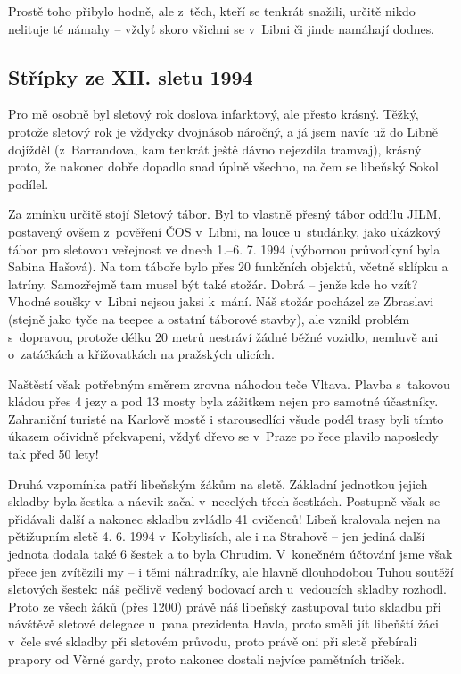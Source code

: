 \documentclass[a5paper, 11pt, twoside]{article}
\begin{document}
Prostě toho přibylo hodně, ale z~těch, kteří se tenkrát snažili, určitě
nikdo nelituje té námahy -- vždyť skoro všichni se v~Libni či jinde
namáhají dodnes.

\subsection{Střípky ze XII. sletu
1994}

Pro mě osobně byl sletový rok doslova infarktový, ale přesto krásný.
Těžký, protože sletový rok je vždycky dvojnásob náročný, a já jsem navíc
už do Libně dojížděl (z~Barrandova, kam tenkrát ještě dávno nejezdila
tramvaj), krásný proto, že nakonec dobře dopadlo snad úplně všechno, na
čem se libeňský Sokol podílel.

Za zmínku určitě stojí Sletový tábor. Byl to vlastně přesný tábor oddílu
JILM, postavený ovšem z~pověření ČOS v~Libni, na louce u~studánky, jako
ukázkový tábor pro sletovou veřejnost ve dnech 1.--6. 7. 1994 (výbornou
průvodkyní byla Sabina Hašová). Na tom táboře bylo přes 20 funkčních
objektů, včetně sklípku a latríny. Samozřejmě tam musel být také stožár.
Dobrá -- jenže kde ho vzít? Vhodné soušky v~Libni nejsou jaksi k~mání.
Náš stožár pocházel ze Zbraslavi (stejně jako tyče na teepee a ostatní
táborové stavby), ale vznikl problém s~dopravou, protože délku 20 metrů
nestráví žádné běžné vozidlo, nemluvě ani o~zatáčkách a křižovatkách na
pražských ulicích.

Naštěstí však potřebným směrem zrovna náhodou teče Vltava. Plavba
s~takovou kládou přes 4 jezy a pod 13 mosty byla zážitkem nejen pro
samotné účastníky. Zahraniční turisté na Karlově mostě i starousedlíci
všude podél trasy byli tímto úkazem očividně překvapeni, vždyť dřevo se
v~Praze po řece plavilo naposledy tak před 50 lety!

Druhá vzpomínka patří libeňským žákům na sletě. Základní jednotkou
jejich skladby byla šestka a nácvik začal v~necelých třech šestkách.
Postupně však se přidávali další a nakonec skladbu zvládlo 41 cvičenců!
Libeň kralovala nejen na pětižupním sletě 4. 6. 1994 v~Kobylisích, ale i
na Strahově -- jen jediná další jednota dodala také 6 šestek a to byla
Chrudim. V~konečném účtování jsme však přece jen zvítězili my -- i těmi
náhradníky, ale hlavně dlouhodobou Tuhou soutěží sletových šestek: náš
pečlivě vedený bodovací arch u~vedoucích skladby rozhodl. Proto ze všech
žáků (přes 1200) právě náš libeňský zastupoval tuto skladbu při návštěvě
sletové delegace u~pana prezidenta Havla, proto směli jít libeňští žáci
v~čele své skladby při sletovém průvodu, proto právě oni při sletě
přebírali prapory od Věrné gardy, proto nakonec dostali nejvíce
pamětních triček.
\end{document}
